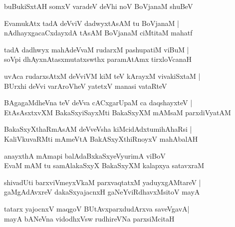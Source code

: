 \begin{shloka}
buBukiSxtAH somxV varadeV deVhi noV BoVjanaM shuBeV
\end{shloka}

\begin{shloka}
EvamukAtx tadA deVviV dadwyxtAsAM tu BoVjanaM |\\
nAdhayxgacaCxdayxdA tAsAM BoVjanaM ciMtitaM mahatf
\end{shloka}

\begin{shloka}
tadA dadhwyx mahAdeVvaM rudarxM pashupatiM viBuM |\\
soVpi dhAyxnAtasxmutatxswthx paramAtAmx tirxloVcanaH
\end{shloka}

\begin{shloka}
uvAca rudarxsAtxM deVviVM kiM teV kArayxM vivakiSxtaM |\\
BUrxhi deVvi varAroVheV yatetxV manasi vataRteV
\end{shloka}

\begin{shloka}
BAgagaMdheVna teV deVva cACxgarUpaM ca daqshayxteV |\\
EtAsAsxtxvXM BakaSxyiSayxMti BakaSxyXM mAMsaM parxdiVyatAM 
\end{shloka}

\begin{shloka}
BakaSxyXthaRmAsAM deVveVsha kiMcidAdxtumihAhaRsi |\\
KaliVkuvaRMti mAmeVtA BakASxyXthiRnoyxV mahAbalAH 
\end{shloka}

\begin{shloka}
anayxthA mAmapi balAdaBxkaSxyeVyurimA viBoV\\
EvaM mAM tu samAlakaSxyX BakaSxyXM kalapxya satavxraM 
\end{shloka}

\begin{shloka}
shivadUti barxviVmeyxVkaM parxvaqtatxM yaduyxgAMtareV |\\
gaMgAdAvxreV dakaSxyajacnxH gaNeYviRdhavxMsitoV mayA 
\end{shloka}

\begin{shloka}
tatarx yajocnxV maqgoV BUtAvxparxdudArxva saveVgavA\R |\\
mayA bANeVna vidodhxVsw rudhireVNa parxsiMcitaH 
\end{shloka}

